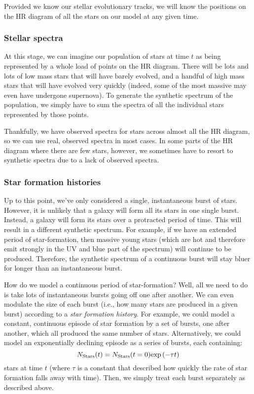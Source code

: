\documentclass[11pt]{article}
\begin{document}
Provided we know our stellar evolutionary tracks, we will know the
positions on the HR diagram of all the stars on our model at any given
time.

\subsubsection{Stellar spectra}
At this stage, we can imagine our population of stars at time $t$ as
being represented by a whole load of points on the HR diagram. There
will be lots and lots of low mass stars that will have barely evolved,
and a handful of high mass stars that will have evolved very quickly
(indeed, some of the most massive may even have undergone
supernova). To generate the synthetic spectrum of the population, we
simply have to sum the spectra of all the individual stars represented
by those points.

Thankfully, we have observed spectra for stars across almost all the
HR diagram, so we can use real, observed spectra in most cases. In
some parts of the HR diagram where there are few stars, however, we
sometimes have to resort to synthetic spectra due to a lack of
observed spectra.

\subsubsection{Star formation histories}
Up to this point, we've only considered a single, instantaneous burst
of stars. However, it is unlikely that a galaxy will form all its
stars in one single burst. Instead, a galaxy will form its stars over
a protracted period of time. This will result in a different synthetic
spectrum. For example, if we have an extended period of
star-formation, then massive young stars (which are hot and therefore
emit strongly in the UV and blue part of the spectrum) will continue
to be produced. Therefore, the synthetic spectrum of a continuous
burst will stay bluer for longer than an instantaneous burst.

How do we model a continuous period of star-formation? Well, all we
need to do is take lots of instantaneous bursts going off one after
another. We can even modulate the size of each burst (i.e., how many
stars are produced in a given burst) according to a {\it star
  formation history}. For example, we could model a constant,
continuous episode of star formation by a set of bursts, one after
another, which all produced the same number of stars. Alternatively,
we could model an exponentially declining episode as a series of
bursts, each containing:
\begin{equation}
N_{\rm Stars}(t) = N_{\rm Stars}(t=0){\rm exp}\left( -\tau t \right)
\end{equation}
stars at time $t$ (where $\tau$ is a constant that described how
quickly the rate of star formation falls away with time). Then, we
simply treat each burst separately as described above.
\end{document}
